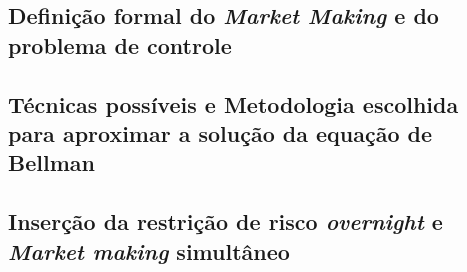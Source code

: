 \subsection{Definição formal do \textit{Market Making} e do problema de controle}
\label{section:problem_description/definition}


\subsection{Técnicas possíveis e Metodologia escolhida para aproximar a solução da equação de Bellman}
\label{section:problem_description/modeling}


\subsection{Inserção da restrição de risco \textit{overnight} e \textit{Market making} simultâneo}
\label{section:problem_description/multivariate_mm}
